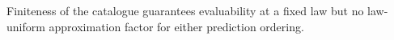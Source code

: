 Finiteness of the catalogue guarantees evaluability at a fixed law but no law-uniform approximation factor for either prediction ordering.
